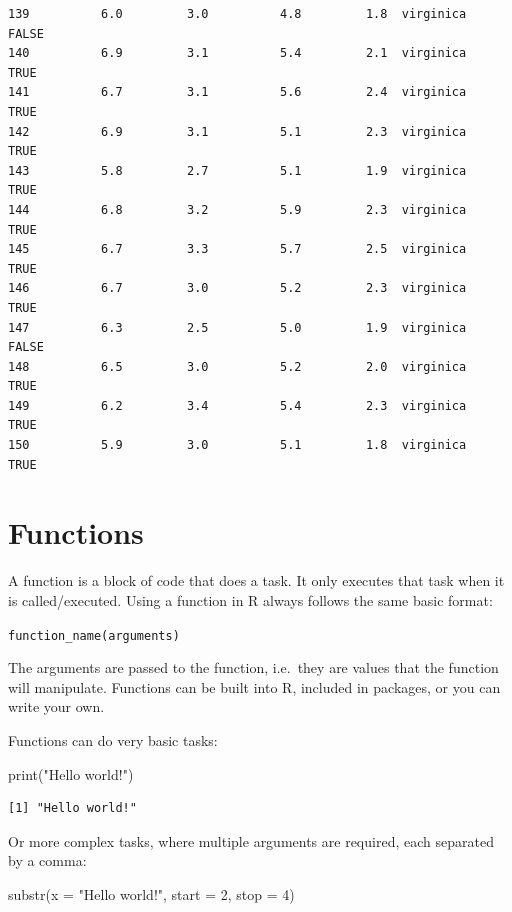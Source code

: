 \documentclass[
  letterpaper,
  DIV=11,
  numbers=noendperiod]{scrreprt}
\newenvironment{Shaded}{\begin{snugshade}}{\end{snugshade}}
\newcommand{\AttributeTok}[1]{\textcolor[rgb]{0.40,0.45,0.13}{#1}}
\newcommand{\DecValTok}[1]{\textcolor[rgb]{0.68,0.00,0.00}{#1}}
\newcommand{\FunctionTok}[1]{\textcolor[rgb]{0.28,0.35,0.67}{#1}}
\newcommand{\NormalTok}[1]{\textcolor[rgb]{0.00,0.23,0.31}{#1}}
\newcommand{\StringTok}[1]{\textcolor[rgb]{0.13,0.47,0.30}{#1}}
\begin{document}
\begin{verbatim}
139          6.0         3.0          4.8         1.8  virginica     FALSE
140          6.9         3.1          5.4         2.1  virginica      TRUE
141          6.7         3.1          5.6         2.4  virginica      TRUE
142          6.9         3.1          5.1         2.3  virginica      TRUE
143          5.8         2.7          5.1         1.9  virginica      TRUE
144          6.8         3.2          5.9         2.3  virginica      TRUE
145          6.7         3.3          5.7         2.5  virginica      TRUE
146          6.7         3.0          5.2         2.3  virginica      TRUE
147          6.3         2.5          5.0         1.9  virginica     FALSE
148          6.5         3.0          5.2         2.0  virginica      TRUE
149          6.2         3.4          5.4         2.3  virginica      TRUE
150          5.9         3.0          5.1         1.8  virginica      TRUE
\end{verbatim}

\hypertarget{functions}{%
\section{Functions}\label{functions}}

A function is a block of code that does a task. It only executes that
task when it is called/executed. Using a function in R always follows
the same basic format:

\texttt{function\_name(arguments)}

The arguments are passed to the function, i.e.~they are values that the
function will manipulate. Functions can be built into R, included in
packages, or you can write your own.

Functions can do very basic tasks:

\begin{Shaded}
\begin{Highlighting}[]
\FunctionTok{print}\NormalTok{(}\StringTok{"Hello world!"}\NormalTok{)}
\end{Highlighting}
\end{Shaded}

\begin{verbatim}
[1] "Hello world!"
\end{verbatim}

Or more complex tasks, where multiple arguments are required, each
separated by a comma:

\begin{Shaded}
\begin{Highlighting}[]
\FunctionTok{substr}\NormalTok{(}\AttributeTok{x =} \StringTok{"Hello world!"}\NormalTok{, }\AttributeTok{start =} \DecValTok{2}\NormalTok{, }\AttributeTok{stop =} \DecValTok{4}\NormalTok{)}
\end{Highlighting}
\end{Shaded}
\end{document}
